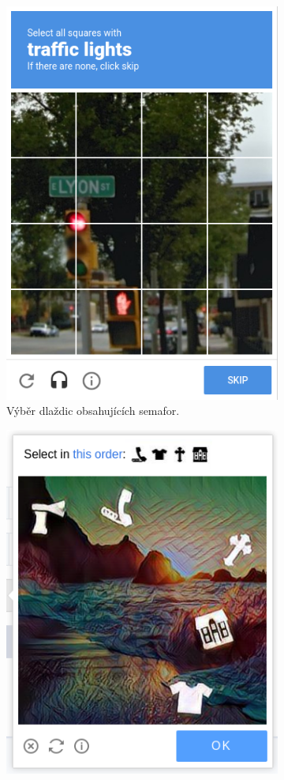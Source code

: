 \documentclass[
  field=ainfp,
  master=true,
  biblatex,
  sourcecodes=false,
  theorems=false,
  glossaries,
  index
]{kidiplom}
\begin{document}
\begin{figure}[H]
\centering
\begin{subfigure}[b]{.5\textwidth}
  \centering
  \includegraphics[width=.8\linewidth]{images/squares.png}
  \caption{Výběr dlaždic obsahujících semafor.}
  \label{fig:recaptcha_selection}
\end{subfigure}%
\begin{subfigure}[b]{.5\textwidth}
  \centering
  \includegraphics[width=.8\linewidth]{images/geetest_select.png}

\end{subfigure}
\end{figure}
\end{document}
